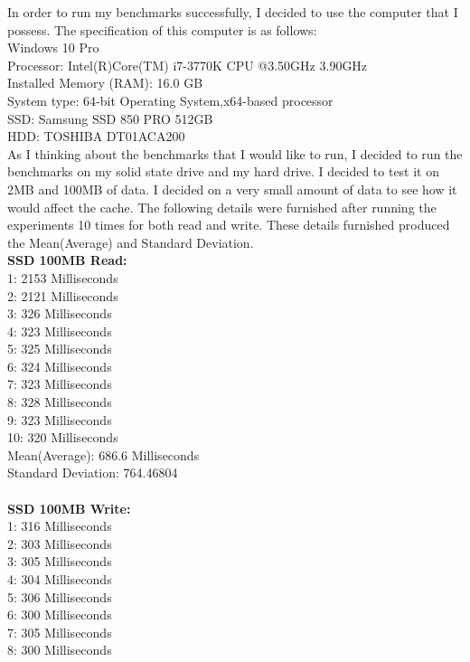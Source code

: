 \documentclass{article}
\begin{document}
In order to run my benchmarks successfully, I decided to use the computer that I possess. The specification of this computer is as follows:
\\
Windows 10 Pro
\\
Processor: Intel(R)Core(TM) i7-3770K CPU @3.50GHz 3.90GHz
\\
Installed Memory (RAM): 16.0 GB
\\
System type: 64-bit Operating System,x64-based processor
\\
SSD: Samsung SSD 850 PRO 512GB
\\
HDD: TOSHIBA DT01ACA200
\\
As I thinking about the benchmarks that I would like to run, I decided to run the benchmarks on my solid state drive and my hard drive. I decided to test it on 2MB and 100MB of data. I decided on a very small amount of data to see how it would affect the cache. The following details were furnished after running the experiments 10 times for both read and write. These details furnished produced the Mean(Average) and Standard Deviation.
\\
\textbf{SSD 100MB Read:}
\\
1: 2153 Milliseconds
\\
2: 2121 Milliseconds
\\
3: 326 Milliseconds
\\
4: 323 Milliseconds
\\
5: 325 Milliseconds
\\
6: 324 Milliseconds
\\
7: 323 Milliseconds
\\
8: 328 Milliseconds
\\
9: 323 Milliseconds
\\
10: 320 Milliseconds
\\
Mean(Average): 686.6 Milliseconds
\\
Standard Deviation: 764.46804
\\
\\
\textbf{SSD 100MB Write:}
\\
1: 316 Milliseconds
\\
2: 303 Milliseconds
\\
3: 305 Milliseconds
\\
4: 304 Milliseconds
\\
5: 306 Milliseconds
\\
6: 300 Milliseconds
\\
7: 305 Milliseconds
\\
8: 300 Milliseconds
\\
\end{document}
